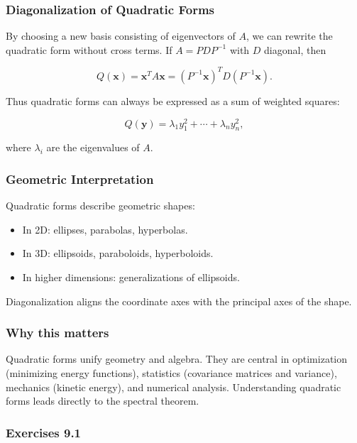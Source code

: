 \documentclass[
  12pt,
  a4paper,
]{article}
\begin{document}
\subsubsection{Diagonalization of Quadratic
Forms}\label{diagonalization-of-quadratic-forms}

By choosing a new basis consisting of eigenvectors of \(A\), we can
rewrite the quadratic form without cross terms. If \(A = PDP^{-1}\) with
\(D\) diagonal, then

\[Q(\mathbf{x}) = \mathbf{x}^T A \mathbf{x} = (P^{-1}\mathbf{x})^T D (P^{-1}\mathbf{x}).\]

Thus quadratic forms can always be expressed as a sum of weighted
squares:

\[Q(\mathbf{y}) = \lambda_1 y_1^2 + \cdots + \lambda_n y_n^2,\]

where \(\lambda_i\) are the eigenvalues of \(A\).

\subsubsection{Geometric
Interpretation}\label{geometric-interpretation-20}

Quadratic forms describe geometric shapes:

\begin{itemize}
\item
  In 2D: ellipses, parabolas, hyperbolas.
\item
  In 3D: ellipsoids, paraboloids, hyperboloids.
\item
  In higher dimensions: generalizations of ellipsoids.
\end{itemize}

Diagonalization aligns the coordinate axes with the principal axes of
the shape.

\subsubsection{Why this matters}\label{why-this-matters-32}

Quadratic forms unify geometry and algebra. They are central in
optimization (minimizing energy functions), statistics (covariance
matrices and variance), mechanics (kinetic energy), and numerical
analysis. Understanding quadratic forms leads directly to the spectral
theorem.

\subsubsection{Exercises 9.1}\label{exercises-91}
\end{document}

